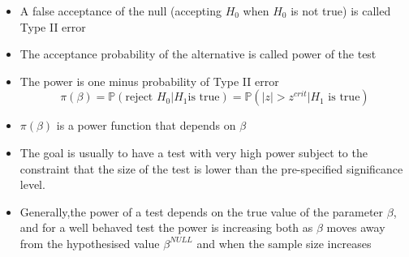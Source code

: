 \documentclass[notes=show]{beamer}
\begin{document}
\begin{frame}%


\begin{itemize}
\item A false acceptance of the null (accepting $H_{0}$ when $H_{0}$ is not
true) is called Type II error

\item The acceptance probability of the alternative is called power of the
test

\item The power is one minus probability of Type II error%
\begin{equation*}
\pi \left( \beta \right) =\mathbb{P}\left( \text{reject }H_{0}|H_{1}\text{
is true}\right) =\mathbb{P}\left( \left\vert z\right\vert >z^{crit}|H_{1}%
\text{ is true}\right)
\end{equation*}

\item $\pi \left( \beta \right) $ is a power function that depends on $\beta 
$

\item The goal is usually to have a test with very high power subject to the
constraint that the size of the test is lower than the pre-specified
significance level.

\item Generally,the power of a test depends on the true value of the
parameter $\beta $, and for a well behaved test the power is increasing both
as $\beta $ moves away from the hypothesised value $\beta ^{NULL}$ and when
the sample size increases
\end{itemize}

\end{frame}%
\end{document}
